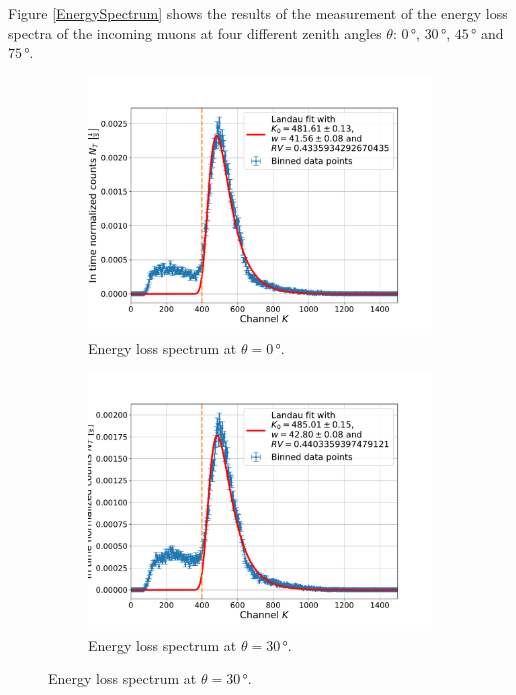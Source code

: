 Figure \ref{EnergySpectrum} shows the results of the measurement of the energy loss spectra of the incoming muons at four different zenith angles $\theta$: $0\,$°, $30\,$°, $45\,$° and $75\,$°.
\begin{figure}[H]
	\centering
	\begin{subfigure}[t]{0.495\textwidth}
		\centering
		\includegraphics[width=\textwidth]{src/EnergySpectrumAt0Degrees}
		\caption{Energy loss spectrum at $\theta =0\,$°.}
		\label{EnergySpectrumAt0Degrees}
	\end{subfigure}
	\begin{subfigure}[t]{0.495\textwidth}
		\centering
		\includegraphics[width=\textwidth]{src/EnergySpectrumAt30Degrees}
		\caption{Energy loss spectrum at $\theta =30\,$°.}

\end{subfigure}
\end{figure}

